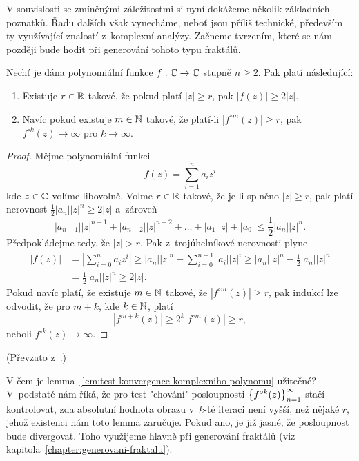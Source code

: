 V souvislosti se zmíněnými záležitostmi si nyní dokážeme několik základních poznatků. Řadu dalších však vynecháme, neboť jsou příliš technické, především ty využívající znalostí z~komplexní analýzy. Začneme tvrzením, které se nám později bude hodit při generování tohoto typu fraktálů.
\begin{lemma}\label{lem:test-konvergence-komplexniho-polynomu}
    Nechť je dána polynomiální funkce $f:\mathbb{C} \rightarrow \mathbb{C}$ stupně $n\geqslant 2$. Pak platí následující:
    \begin{enumerate}[label=(\roman*)]
        \item Existuje $r\in\mathbb{R}$ takové, že pokud platí $|z|\geqslant r$, pak $|f(z)|\geqslant2|z|$.
        \item Navíc pokud existuje $m\in\mathbb{N}$ takové, že platí-li $|f^{\circ m}(z)|\geqslant r$, pak $f^{\circ k}(z)\to\infty$ pro $k\to\infty$.
    \end{enumerate} 
\end{lemma}
\begin{proof}
    Mějme polynomiální funkci
    \[f(z)=\sum_{i=1}^{n}a_iz^i\]
    kde $z\in\mathbb{C}$ volíme libovolně. Volme $r\in\mathbb{R}$ takové, že je-li splněno $|z|\geqslant r$, pak platí nerovnost $\frac{1}{2}|a_n||z|^n\geqslant 2|z|$ a~zároveň
    \[|a_{n-1}||z|^{n-1}+|a_{n-2}||z|^{n-2}+\dots+|a_1||z|+|a_0|\leqslant\frac{1}{2}|a_n||z|^n.\]
    Předpokládejme tedy, že $|z|>r$. Pak z~trojúhelníkové nerovnosti plyne
    \begin{align*}
        |f(z)|&=\left|\sum_{i=0}^{n}a_iz^i\right|\geqslant|a_n||z|^n-\sum_{i=0}^{n-1}|a_i||z|^i\geqslant|a_n||z|^n-\frac{1}{2}|a_n||z|^n\\
        &=\frac{1}{2}|a_n||z|^n\geqslant2|z|.
    \end{align*}
    Pokud navíc platí, že existuje $m\in\mathbb{N}$ takové, že $|f^{\circ m}(z)|\geqslant r$, pak indukcí lze odvodit, že pro $m+k$, kde $k\in\mathbb{N}$, platí
    \[|f^{m+k}(z)|\geqslant2^k|f^{\circ m}(z)|\geqslant r,\]
    neboli $f^{\circ k}(z)\to\infty$.
\end{proof}
(Převzato z~\cite[str. 237]{Falconer1989}.)

V čem je lemma~\ref{lem:test-konvergence-komplexniho-polynomu} užitečné? V~podstatě nám říká, že pro test "chování" posloupnosti $\left\{f^{\circ k}(z)\right\}_{n=1}^\infty$ stačí kontrolovat, zda absolutní hodnota obrazu v~$k$-té iteraci není vyšší, než nějaké $r$, jehož existenci nám toto lemma zaručuje. Pokud ano, je již jasné, že posloupnost bude divergovat. Toho využijeme hlavně při generování fraktálů (viz kapitola~\ref{chapter:generovani-fraktalu}).


